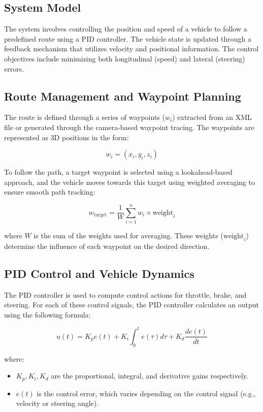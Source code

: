 \documentclass[conference]{IEEEtran}
\begin{document}
\subsection{System Model}

The system involves controlling the position and speed of a vehicle to follow a predefined route using a PID controller. The vehicle state is updated through a feedback mechanism that utilizes velocity and positional information. The control objectives include minimizing both longitudinal (speed) and lateral (steering) errors.

\subsection{Route Management and Waypoint Planning}
The route is defined through a series of waypoints ($w_i$) extracted from an XML file or generated through the camera-based waypoint tracing. The waypoints are represented as 3D positions in the form:

\begin{equation}
w_i = (x_i, y_i, z_i)
\end{equation}

To follow the path, a target waypoint is selected using a lookahead-based approach, and the vehicle moves towards this target using weighted averaging to ensure smooth path tracking:

\begin{equation}
w_{\text{target}} = \frac{1}{W} \sum_{i=1}^{n} w_i \times \text{weight}_i
\end{equation}

where $W$ is the sum of the weights used for averaging. These weights ($\text{weight}_i$) determine the influence of each waypoint on the desired direction.

\subsection{PID Control and Vehicle Dynamics}
The PID controller is used to compute control actions for throttle, brake, and steering. For each of these control signals, the PID controller calculates an output using the following formula:

\begin{equation}
u(t) = K_p e(t) + K_i \int_{0}^{t} e(\tau) d\tau + K_d \frac{de(t)}{dt}
\end{equation}

where:
\begin{itemize}
    \item $K_p, K_i, K_d$ are the proportional, integral, and derivative gains respectively.
    \item $e(t)$ is the control error, which varies depending on the control signal (e.g., velocity or steering angle).
\end{itemize}
\end{document}
